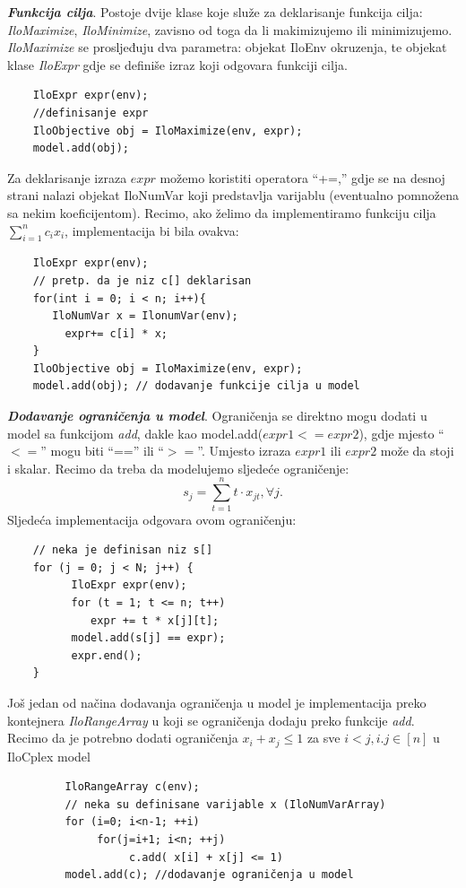\documentclass[a4paper, utf8, 11pt, colorlinks]{article}
\begin{document}
 \noindent \textbf{\emph{Funkcija cilja}}. 
 Postoje dvije klase koje služe za deklarisanje funkcija cilja: \emph{IloMaximize}, \emph{IloMinimize}, zavisno od toga da li makimizujemo ili minimizujemo. \emph{IloMaximize} se prosljeđuju dva parametra: objekat IloEnv okruzenja, te objekat klase \emph{IloExpr} gdje se definiše  izraz koji odgovara funkciji cilja. 
 
 \begin{verbatim}
 	IloExpr expr(env);
 	//definisanje expr
 	IloObjective obj = IloMaximize(env, expr);
 	model.add(obj);
 \end{verbatim}
 
 \noindent Za deklarisanje izraza $expr$ možemo koristiti operatora ``+=,'' gdje se na desnoj strani nalazi objekat IloNumVar koji predstavlja varijablu (eventualno pomnožena sa nekim koeficijentom). 
 Recimo, ako želimo da implementiramo funkciju cilja $\sum_{i=1}^n c_i x_i$, implementacija bi bila ovakva:
 
 \begin{verbatim}
 	IloExpr expr(env);
 	// pretp. da je niz c[] deklarisan
 	for(int i = 0; i < n; i++){
       IloNumVar x = IlonumVar(env);
 	     expr+= c[i] * x;
 	}
 	IloObjective obj = IloMaximize(env, expr);
 	model.add(obj); // dodavanje funkcije cilja u model
 \end{verbatim}
 
 \noindent \textbf{\emph{Dodavanje ograničenja u model}}. Ograničenja se direktno mogu dodati  u model sa funkcijom \emph{add}, dakle kao 
 model.add($expr1 <= expr2$), gdje mjesto ``$<=$'' mogu biti ``=='' ili ``$>=$''. Umjesto izraza $expr1$ ili $expr2$ može da stoji i skalar. Recimo da treba da modelujemo sljedeće ograničenje:
 $$s_j = \sum_{t=1}^n t \cdot x_{jt}, \forall j.$$ 
 Sljedeća implementacija odgovara ovom ograničenju: 
 \begin{verbatim}
 	// neka je definisan niz s[]
 	for (j = 0; j < N; j++) {
 		  IloExpr expr(env);
 		  for (t = 1; t <= n; t++)
 	  	     expr += t * x[j][t];            
 		  model.add(s[j] == expr);
 		  expr.end();
 	}
 \end{verbatim}
 Još jedan od načina dodavanja ograničenja u model je implementacija preko kontejnera \emph{IloRangeArray} u koji se ograničenja dodaju preko funkcije \emph{add}.   
 Recimo da je potrebno dodati ograničenja $x_i + x_j \leq 1$ za sve $i<j, i.j \in [n]$ u IloCplex model
 
 \begin{verbatim}
 	     IloRangeArray c(env);
 	     // neka su definisane varijable x (IloNumVarArray) 
 	     for (i=0; i<n-1; ++i)
 	          for(j=i+1; i<n; ++j)
 	               c.add( x[i] + x[j] <= 1)     
      	 model.add(c); //dodavanje ograničenja u model
 \end{verbatim}
 
\end{document}
